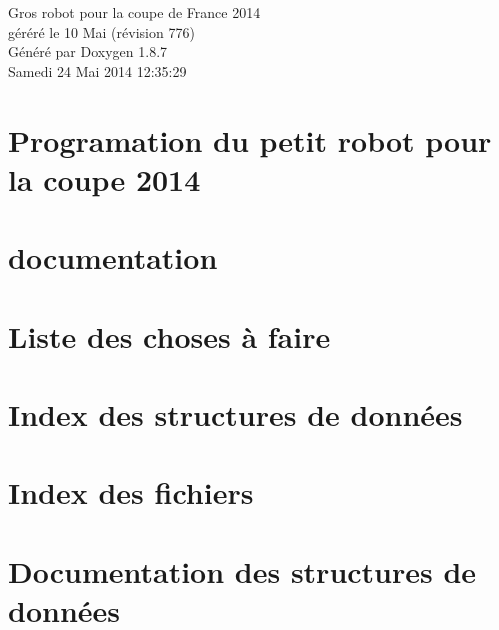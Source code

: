 \documentclass[twoside]{book}
\newcommand{\+}{\discretionary{\mbox{\scriptsize$\hookleftarrow$}}{}{}}
\newcommand{\clearemptydoublepage}{%
  \newpage{\pagestyle{empty}\cleardoublepage}%
}
\begin{document}
\hypersetup{pageanchor=false,
             bookmarks=true,
             bookmarksnumbered=true,
             pdfencoding=unicode
            }
\begin{titlepage}
\vspace*{7cm}
\begin{center}%
{\Large Gros robot pour la coupe de France 2014 \\[1ex]\large géréré le 10 Mai (révision 776) }\\
\vspace*{1cm}
{\large Généré par Doxygen 1.8.7}\\
\vspace*{0.5cm}
{\small Samedi 24 Mai 2014 12:35:29}\\
\end{center}
\end{titlepage}
\clearemptydoublepage
\tableofcontents
\clearemptydoublepage
{}
\hypersetup{pageanchor=true}

\chapter{Programation du petit robot pour la coupe 2014}
\label{index}\hypertarget{index}{}
\chapter{documentation}
\label{md_documentation}
\hypertarget{md_documentation}{}

\chapter{Liste des choses à faire}
\label{todo}
\hypertarget{todo}{}

\chapter{Index des structures de données}

\chapter{Index des fichiers}

\chapter{Documentation des structures de données}

















\end{document}
